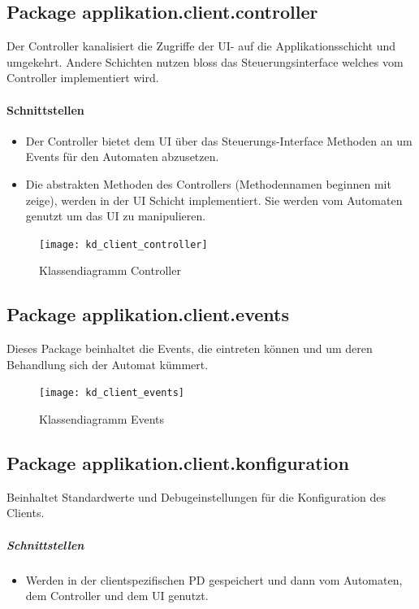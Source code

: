\documentclass[12pt,halfparskip]{scrartcl}
\begin{document}
	\subsection{Package applikation.client.controller}

		Der Controller kanalisiert die Zugriffe der UI- auf die Applikationsschicht und umgekehrt. Andere Schichten nutzen bloss das Steuerungsinterface welches vom Controller implementiert wird.

		\paragraph{Schnittstellen}
		\begin{itemize}
			\item Der Controller bietet dem UI über das Steuerungs-Interface Methoden an um Events für den Automaten abzusetzen.
			\item Die abstrakten Methoden des Controllers (Methodennamen beginnen mit zeige), werden in der UI Schicht implementiert. Sie werden vom Automaten genutzt um das UI zu manipulieren.
		\end{itemize}

		\begin{figure}[H]
			\centering
			\texttt{[image: kd\_client\_controller]}
			\caption{Klassendiagramm Controller}
			\label{fig:kd_client_controller}
		\end{figure}
		
	\subsection{Package applikation.client.events}

		Dieses Package beinhaltet die Events, die eintreten können und um deren Behandlung sich der Automat kümmert.
		\begin{figure}[H]
			\centering
			\texttt{[image: kd\_client\_events]}
			\caption{Klassendiagramm Events}
			\label{fig:kd_client_events}
		\end{figure}
		
	\subsection{Package applikation.client.konfiguration}

		Beinhaltet Standardwerte und Debugeinstellungen für die Konfiguration des Clients.	

		\subparagraph{Schnittstellen}
		\begin{itemize}
			\item Werden in der clientspezifischen PD gespeichert und dann vom Automaten, dem Controller und dem UI genutzt.
		\end{itemize}
	
\end{document}
